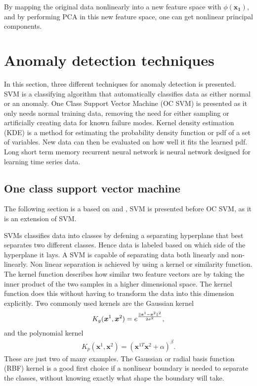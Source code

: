         By mapping the original data nonlinearly into a new feature space with $\phi(\bm{x_1})$, and by performing PCA in this new feature space, one can get nonlinear principal components.


\section{Anomaly detection techniques}
    In this section, three different techniques for anomaly detection is presented. SVM is a classifying algorithm that automatically classifies data as either normal or an anomaly. One Class Support Vector Machine (OC SVM) is presented as it only needs normal training data, removing the need for either sampling or artificially creating data for known failure modes. Kernel density estimation (KDE) is a method for estimating the probability density function or pdf of a set of variables. New data can then be evaluated on how well it fits the learned pdf. Long short term memory recurrent neural network is neural network designed for learning time series data. 

    \subsection{One class support vector machine}\label{subsec:OCSVM}
    
            The following section is a based on \cite{Aasnes2017} and \cite{Hastie}, SVM is presented before OC SVM, as it is an extension of SVM. 
            
            SVMs classifies data into classes by defening a separating hyperplane that best separates two different classes. Hence data is labeled based on which side of the hyperplane it lays. A SVM is capable of separating data both linearly and non-linearly. Non linear separation is achieved by using a kernel or similarity function. The kernel function describes how similar two feature vectors are by taking the inner product of the two samples in a higher dimensional space. The kernel function does this without having to transform the data into this dimension explicitly. Two commonly used kernels are the Gaussian kernel
            \begin{align}
                K_g(\bm x^{1},\bm x^{2}) = e^{\frac{\lVert\bm x^{1}-\bm x^{2}\rVert^2}{2\sigma^2}}, 
                \label{svm:gauss}
            \end{align}
            and the polynomial kernel
            \begin{align}
                K_p(\bm x^{1},\bm x^{2}) = (\bm x^{1T}\bm x^{2} + \alpha)^\beta.
                \label{svm:poly}
            \end{align}
           These are just two of many examples. The Gaussian or radial basis function (RBF) kernel is a good first choice if a nonlinear boundary is needed to separate the classes, without knowing exactly what shape the boundary will take.
    
